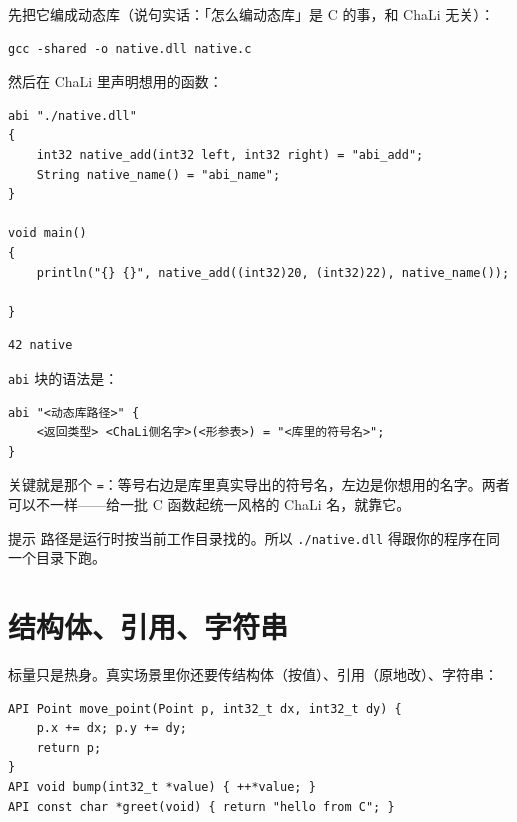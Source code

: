 先把它编成动态库（说句实话：「怎么编动态库」是 C 的事，和 ChaLi 无关）：

\par
\medskip
\begin{lstlisting}[style=sh]
gcc -shared -o native.dll native.c
\end{lstlisting}
\par
\medskip

然后在 ChaLi 里声明想用的函数：

\par
\medskip
\begin{lstlisting}[style=chali]
abi "./native.dll"
{
    int32 native_add(int32 left, int32 right) = "abi_add";
    String native_name() = "abi_name";
}

void main()
{
    println("{} {}", native_add((int32)20, (int32)22), native_name());

}
\end{lstlisting}
\par
\medskip

\par
\medskip
\begin{lstlisting}[style=out]
42 native
\end{lstlisting}
\par
\medskip

\texttt{abi} 块的语法是：

\par
\medskip
\begin{lstlisting}[style=out]
abi "<动态库路径>" {
    <返回类型> <ChaLi侧名字>(<形参表>) = "<库里的符号名>";
}
\end{lstlisting}
\par
\medskip

关键就是那个 \texttt{=\allowbreak{}}：等号右边是库里真实导出的符号名，左边是你想用的名字。两者可以不一样——给一批 C 函数起统一风格的 ChaLi 名，就靠它。

\begin{tip}{提示}
路径是运行时按当前工作目录找的。所以 \texttt{.\allowbreak{}/\allowbreak{}native.\allowbreak{}dll} 得跟你的程序在同一个目录下跑。
\end{tip}

\section{结构体、引用、字符串}

标量只是热身。真实场景里你还要传结构体（按值）、引用（原地改）、字符串：

\par
\medskip
\begin{lstlisting}[style=c]
API Point move_point(Point p, int32_t dx, int32_t dy) {
    p.x += dx; p.y += dy;
    return p;
}
API void bump(int32_t *value) { ++*value; }
API const char *greet(void) { return "hello from C"; }
\end{lstlisting}
\par
\medskip

